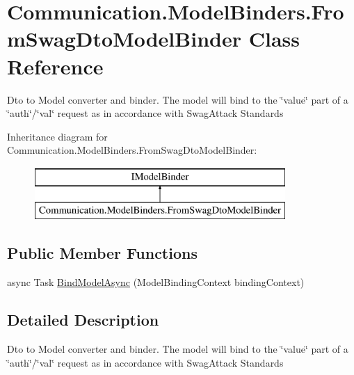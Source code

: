 \hypertarget{class_communication_1_1_model_binders_1_1_from_swag_dto_model_binder}{}\section{Communication.\+Model\+Binders.\+From\+Swag\+Dto\+Model\+Binder Class Reference}
\label{class_communication_1_1_model_binders_1_1_from_swag_dto_model_binder}


Dto to Model converter and binder. The model will bind to the \char`\"{}value\char`\"{} part of a \char`\"{}auth\char`\"{}/\char`\"{}val\char`\"{} request as in accordance with Swag\+Attack Standards  


Inheritance diagram for Communication.\+Model\+Binders.\+From\+Swag\+Dto\+Model\+Binder\+:\begin{figure}[H]
\begin{center}
\leavevmode
\includegraphics[height=2.000000cm]{class_communication_1_1_model_binders_1_1_from_swag_dto_model_binder}
\end{center}
\end{figure}
\subsection*{Public Member Functions}
\begin{DoxyCompactItemize}
\item 
async Task \mbox{\hyperlink{class_communication_1_1_model_binders_1_1_from_swag_dto_model_binder_a9f06cf186abe70ff88cf3895a5d83719}{Bind\+Model\+Async}} (Model\+Binding\+Context binding\+Context)
\end{DoxyCompactItemize}


\subsection{Detailed Description}
Dto to Model converter and binder. The model will bind to the \char`\"{}value\char`\"{} part of a \char`\"{}auth\char`\"{}/\char`\"{}val\char`\"{} request as in accordance with Swag\+Attack Standards 



